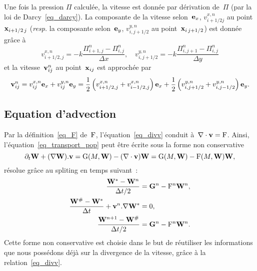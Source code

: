\documentclass[main.tex]{subfiles}
\begin{document}
Une fois la pression $\Pi$ calculée, la vitesse est donnée par dérivation de~$\Pi$ (par la loi de Darcy~\eqref{eq_darcy}).
La composante de la vitesse selon~${\bf e}_x$, $v^{x,n}_{i+1/2 j}$ au point 
$\mathbf{x}_{i+1/2\,j}$ ({\it resp.} la composante selon~${\bf e}_y$, $v^{y,n}_{i,
  j+1/2}$ au point~${\mathbf{x}_{i\,j+1/2}}$) est donnée grâce à
\begin{equation*}
v^{x,n}_{i+1/2,j} = -k \frac{\Pi^n_{i+1,j}-\Pi^n_{i,j}}{\Delta x},\quad
v^{y,n}_{i,j+1/2} = -k \frac{\Pi^n_{i,j+1}-\Pi^n_{i,j}}{\Delta y}
\end{equation*}
et la vitesse~$\mathbf{v}^n_{ij}$ au point~$\mathbf{x}_{ij}$ est approchée par
\begin{align}
  \label{eq_vit_discr}
  \mathbf{v}^n_{ij}=    v^{x,n}_{ij}{\bf e}_x
  +v^{y,n}_{ij}{\bf e}_y=\frac{1}{2}\left(v^{x,n}_{i+1/2,j}
    +v^{x,n}_{i-1/2,j} \right) {\bf e}_x+\frac{1}{2}\left(v^{y,n}_{i,j+1/2}
    +v^{y,n}_{i,j-1/2} \right) {\bf e}_y.
\end{align}

\subsection{Equation d'advection}
Par la définition~\eqref{eq_F} de~${\rm F}$, l'équation~\eqref{eq_divv} 
conduit à~$\nabla\cdot\mathbf{v}={\rm F}$. 
Ainsi, l'équation~\eqref{eq_transport_pop} peut être écrite sous la forme non conservative
\begin{equation}\label{eq_non_conservative}
\partial_t {\bf W} + (\nabla {\bf W}).\mathbf{v} = {\rm G}(M,{\bf W})-(\nabla\cdot \mathbf{v}){\bf W} = {\rm G}(M,{\bf W})-{\rm F}(M,{\bf W}){\bf W},
\end{equation}
résolue grâce au spliting en temps suivant~:
\begin{align}
 \dfrac{\W^*-\W^n}{\Delta t / 2}  &= \GG^n-\Frm^n\W^n, %
 \label{eq_snd_membre} \\
\dfrac{\W^\#-\W^*}{\Delta t} + \vit^n.\nabla \W^*&= 0,%
 \label{eq_transp_weno}\\
 \dfrac{\W^{n+1}-\W^\#}{\Delta t / 2}  &= \GG^n-\Frm^n\W^n. \label{eq_snd_membre2} 
\end{align}
Cette forme non conservative est choisie dans le but de réutiliser les informations que nous possédons déjà sur la divergence de la vitesse, grâce à la relation~\eqref{eq_divv}.
\end{document}
